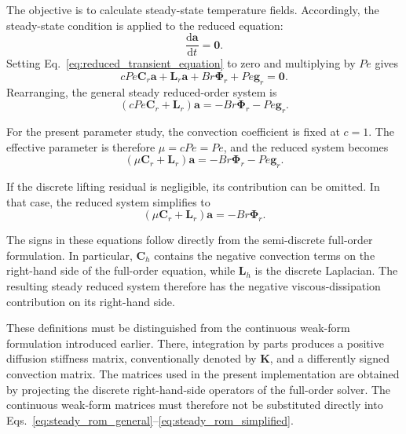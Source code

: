 The objective is to calculate steady-state temperature
fields. Accordingly, the steady-state condition is applied
to the reduced equation:
\[
\frac{\mathrm{d}\mathbf{a}}{\mathrm{d}t}=\mathbf{0}.
\]
Setting Eq.~\eqref{eq:reduced_transient_equation} to zero
and multiplying by $Pe$ gives
\begin{equation}
    cPe\mathbf{C}_r\mathbf{a}
    +\mathbf{L}_r\mathbf{a}
    +Br\boldsymbol{\Phi}_r
    +Pe\mathbf{g}_r
    =\mathbf{0}.
\end{equation}
Rearranging, the general steady reduced-order system is
\begin{equation}
    \boxed{
    (cPe\mathbf{C}_r+\mathbf{L}_r)\mathbf{a}
    =
    -Br\boldsymbol{\Phi}_r-Pe\mathbf{g}_r.
    }
    \label{eq:steady_rom_general}
\end{equation}

For the present parameter study, the convection
coefficient is fixed at $c=1$. The effective parameter is
therefore $\mu=cPe=Pe$, and the reduced system becomes
\begin{equation}
    \boxed{
    (\mu\mathbf{C}_r+\mathbf{L}_r)\mathbf{a}
    =
    -Br\boldsymbol{\Phi}_r-Pe\mathbf{g}_r.
    }
    \label{eq:steady_rom_mu}
\end{equation}

If the discrete lifting residual is negligible, its
contribution can be omitted. In that case, the reduced
system simplifies to
\begin{equation}
    \boxed{
    (\mu\mathbf{C}_r+\mathbf{L}_r)\mathbf{a}
    =
    -Br\boldsymbol{\Phi}_r.
    }
    \label{eq:steady_rom_simplified}
\end{equation}

The signs in these equations follow directly from the
semi-discrete full-order formulation. In particular,
$\mathbf{C}_h$ contains the negative convection terms
on the right-hand side of the full-order equation, while
$\mathbf{L}_h$ is the discrete Laplacian. The resulting
steady reduced system therefore has the negative
viscous-dissipation contribution on its right-hand side.

These definitions must be distinguished from the
continuous weak-form formulation introduced earlier.
There, integration by parts produces a positive
diffusion stiffness matrix, conventionally denoted by
$\mathbf{K}$, and a differently signed convection
matrix. The matrices used in the present implementation
are obtained by projecting the discrete right-hand-side
operators of the full-order solver. The continuous
weak-form matrices must therefore not be substituted
directly into Eqs.~\eqref{eq:steady_rom_general}--\eqref{eq:steady_rom_simplified}.

